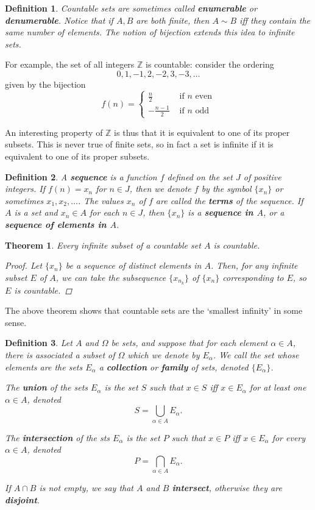 \documentclass{scrbook}
\newcommand{\Z}{\mathbb{Z}}
\newtheorem{theorem}{Theorem}
\newtheorem{definition}{Definition}
\begin{document}
\begin{definition}
Countable sets are sometimes called \textbf{enumerable} or \textbf{denumerable}. Notice that if $A, B$ are both finite, then $A \sim B$ iff they contain the same number of elements. The notion of bijection extends this idea to infinite sets.
\end{definition}

For example, the set of all integers $\Z$ is countable: consider the ordering
\[
	0, 1, -1, 2, -2, 3, -3, \dotsc
\]
given by the bijection
\[
	f(n) = \begin{cases}
		\frac{n}{2} & \text{ if $n$ even} \\
		-\frac{n-1}{2} & \text{ if $n$ odd}
		\end{cases}
\]

An interesting property of $\Z$ is thus that it is equivalent to one of its proper subsets. This is never true of finite sets, so in fact a set is infinite if it is equivalent to one of its proper subsets. 

\begin{definition}
A \textbf{sequence} is a function $f$ defined on the set $J$ of positive integers. If $f(n) = x_n$ for $n \in J$, then we denote $f$ by the symbol $\{x_n\}$ or sometimes $x_1, x_2, \dotsc$. The values $x_n$ of $f$ are called the \textbf{terms} of the sequence. If $A$ is a set and $x_n \in A$ for each $n \in J$, then $\{x_n\}$ is a \textbf{sequence in $A$}, or a \textbf{sequence of elements in $A$}.
\end{definition}

\begin{theorem}
Every infinite subset of a countable set $A$ is countable. 

\begin{proof}
Let $\{x_n\}$ be a sequence of distinct elements in $A$. Then, for any infinite subset $E$ of $A$, we can take the subsequence $\{x_{n_k}\}$ of $\{x_n\}$ corresponding to $E$, so $E$ is countable.
\end{proof}
\end{theorem}

The above theorem shows that countable sets are the `smallest infinity' in some sense. 

\begin{definition}
Let $A$ and $\Omega$ be sets, and suppose that for each element $\alpha \in A$, there is associated a subset of $\Omega$ which we denote by $E_{\alpha}$. We call the set whose elements are the sets $E_{\alpha}$ a \textbf{collection} or \textbf{family} of sets, denoted $\{E_\alpha\}$. 

The \textbf{union} of the sets $E_\alpha$ is the set $S$ such that $x \in S$ iff $x \in E_\alpha$ for at least one $\alpha \in A$, denoted
\[
	S = \bigcup_{\alpha \in A}{E_\alpha}.
\]

The \textbf{intersection} of the sts $E_{\alpha}$ is the set $P$ such that $x \in P$ iff $x \in E_\alpha$ for every $\alpha \in A$, denoted
\[
	P = \bigcap_{\alpha \in A}{E_\alpha}.
\]

If $A \cap B$ is not empty, we say that $A$ and $B$ \textbf{intersect}, otherwise they are \textbf{disjoint}.
\end{definition}
\end{document}

